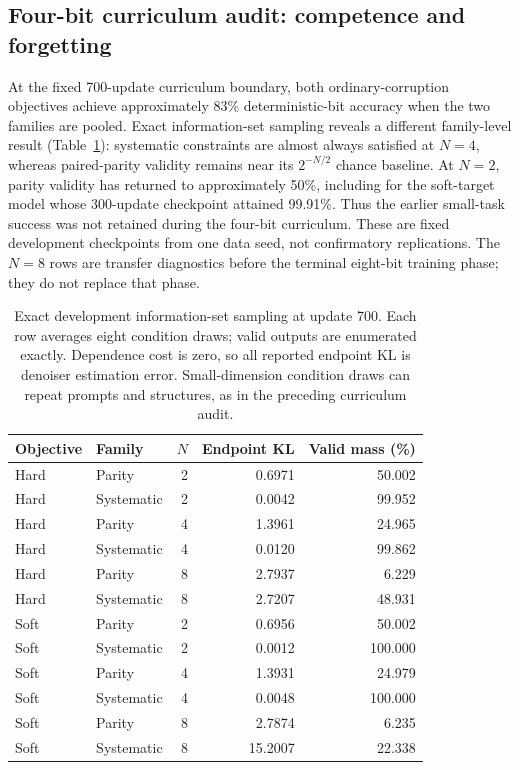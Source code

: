 \subsection{Four-bit curriculum audit: competence and forgetting}
At the fixed 700-update curriculum boundary, both ordinary-corruption objectives achieve approximately 83\% deterministic-bit accuracy when the two families are pooled. Exact information-set sampling reveals a different family-level result (Table~\ref{tab:dev700exact}): systematic constraints are almost always satisfied at $N=4$, whereas paired-parity validity remains near its $2^{-N/2}$ chance baseline. At $N=2$, parity validity has returned to approximately 50\%, including for the soft-target model whose 300-update checkpoint attained 99.91\%. Thus the earlier small-task success was not retained during the four-bit curriculum. These are fixed development checkpoints from one data seed, not confirmatory replications. The $N=8$ rows are transfer diagnostics before the terminal eight-bit training phase; they do not replace that phase.

\begin{table}[ht]
\centering\small
\begin{tabular}{llrrr}
\toprule
Objective & Family & $N$ & Endpoint KL & Valid mass (\%) \\
\midrule
Hard & Parity & 2 & 0.6971 & 50.002 \\
Hard & Systematic & 2 & 0.0042 & 99.952 \\
Hard & Parity & 4 & 1.3961 & 24.965 \\
Hard & Systematic & 4 & 0.0120 & 99.862 \\
Hard & Parity & 8 & 2.7937 & 6.229 \\
Hard & Systematic & 8 & 2.7207 & 48.931 \\
Soft & Parity & 2 & 0.6956 & 50.002 \\
Soft & Systematic & 2 & 0.0012 & 100.000 \\
Soft & Parity & 4 & 1.3931 & 24.979 \\
Soft & Systematic & 4 & 0.0048 & 100.000 \\
Soft & Parity & 8 & 2.7874 & 6.235 \\
Soft & Systematic & 8 & 15.2007 & 22.338 \\
\bottomrule
\end{tabular}
\caption{Exact development information-set sampling at update 700. Each row averages eight condition draws; valid outputs are enumerated exactly. Dependence cost is zero, so all reported endpoint KL is denoiser estimation error. Small-dimension condition draws can repeat prompts and structures, as in the preceding curriculum audit.}
\label{tab:dev700exact}
\end{table}
